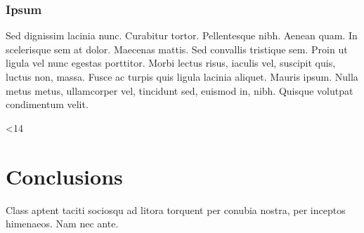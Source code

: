 \documentclass{dtakdoc}   %
\begin{document}
\subsubsection{Ipsum}

\newcount\filler {}
\loop
  Sed dignissim lacinia nunc. Curabitur tortor. Pellentesque nibh. Aenean quam. In scelerisque sem at dolor.
  Maecenas mattis. Sed convallis tristique sem. Proin ut ligula vel nunc egestas porttitor. Morbi lectus risus,
  iaculis vel, suscipit quis, luctus non, massa. Fusce ac turpis quis ligula lacinia aliquet. Mauris ipsum.
  Nulla metus metus, ullamcorper vel, tincidunt sed, euismod in, nibh. Quisque volutpat condimentum velit.

  \advance{}
\ifnum\filler<14 \repeat

\section{Conclusions}

Class aptent taciti sociosqu ad litora torquent per conubia nostra, per inceptos himenaeos. Nam nec ante.
\end{document}
